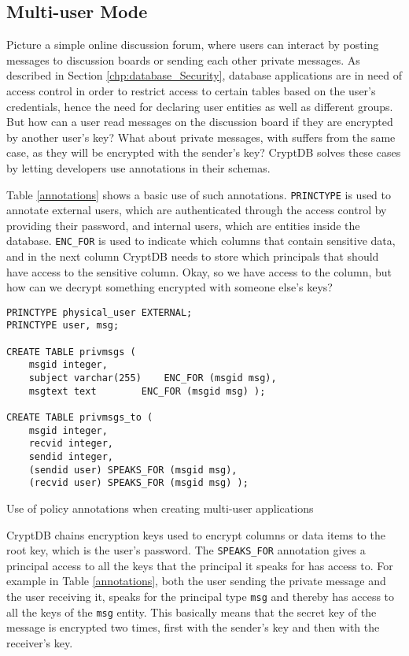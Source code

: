 \subsection{Multi-user Mode}
Picture a simple online discussion forum, where users can interact by posting messages to discussion boards or sending each other private messages. As described in Section \ref{chp:database_Security}, database applications are in need of access control in order to restrict access to certain tables based on the user's credentials, hence the need for declaring user entities as well as different groups. But how can a user read messages on the discussion board if they are encrypted by another user's key? What about private messages, with suffers from the same case, as they will be encrypted with the sender's key? CryptDB solves these cases by letting developers use annotations in their schemas.

Table \ref{annotations} shows a basic use of such annotations. \verb!PRINCTYPE! is used to annotate external users, which are authenticated through the access control by providing their password, and internal users, which are entities inside the database. \verb!ENC_FOR! is used to indicate which columns that contain sensitive data, and in the next column CryptDB needs to store which principals that should have access to the sensitive column. Okay, so we have access to the column, but how can we decrypt something encrypted with someone else's keys?

\begin{table}[H]
\begin{Verbatim}[frame=single]
PRINCTYPE physical_user EXTERNAL;
PRINCTYPE user, msg;

CREATE TABLE privmsgs (
	msgid integer,
	subject varchar(255)	ENC_FOR (msgid msg),
	msgtext text		ENC_FOR (msgid msg) );

CREATE TABLE privmsgs_to (
	msgid integer,
	recvid integer,
	sendid integer,
	(sendid user) SPEAKS_FOR (msgid msg),
	(recvid user) SPEAKS_FOR (msgid msg) ); 
\end{Verbatim}
\caption{Use of policy annotations when creating multi-user applications}
\label{annotations}
\end{table}

CryptDB chains encryption keys used to encrypt columns or data items to the root key, which is the user's password. The \verb!SPEAKS_FOR! annotation gives a principal access to all the keys that the principal it speaks for has access to. For example in Table \ref{annotations}, both the user sending the private message and the user receiving it, speaks for the principal type \verb!msg! and thereby has access to all the keys of the \verb!msg! entity. This basically means that the secret key of the message is encrypted two times, first with the sender's key and then with the receiver's key.

